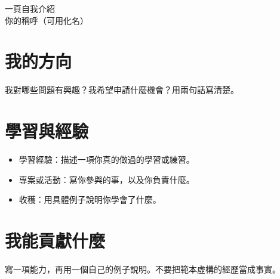 \documentclass[11pt,a4paper]{article}
\begin{document}
\begin{center}
  {\LARGE 一頁自我介紹}\\[0.5em]
  你的稱呼（可用化名）
\end{center}

\section*{我的方向}
我對哪些問題有興趣？我希望申請什麼機會？用兩句話寫清楚。

\section*{學習與經驗}
\begin{itemize}
  \item 學習經驗：描述一項你真的做過的學習或練習。
  \item 專案或活動：寫你參與的事，以及你負責什麼。
  \item 收穫：用具體例子說明你學會了什麼。
\end{itemize}

\section*{我能貢獻什麼}
寫一項能力，再用一個自己的例子說明。不要把範本虛構的經歷當成事實。
\end{document}
